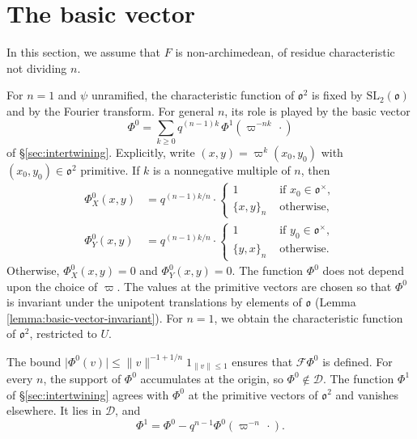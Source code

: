 \documentclass[reqno]{amsart}
\theoremstyle{plain}
\theoremstyle{definition}
\theoremstyle{itplain}
\numberwithin{equation}{section}
\numberwithin{theorem}{section}
\begin{document}
\section{The basic vector}\label{sec:basic-vector}
In this section, we assume that $F$ is non-archimedean, of residue characteristic not dividing $n$.

For $n = 1$ and $\psi$ unramified, the characteristic function of $\mathfrak{o}^2$ is fixed by $\mathrm{SL}_2(\mathfrak{o})$ and by the Fourier transform.  For general $n$, its role is played by the basic vector
\begin{equation*}
  \Phi^0 = \sum_{k \geq 0} q^{(n-1) k} \, \Phi^1(\varpi^{- n k} \, \cdot)
\end{equation*}
of \S\ref{sec:intertwining}.  Explicitly, write $(x, y) = \varpi^k (x_0, y_0)$ with $(x_0, y_0) \in \mathfrak{o}^2$ primitive.  If $k$ is a nonnegative multiple of $n$, then
\begin{equation*}
  \begin{aligned}
    \Phi^0_X(x, y) &= q^{(n-1) k / n} \cdot
    \begin{cases}
      1 & \text{ if } x_0 \in \mathfrak{o}^\times, \\
      \{x, y\}_n & \text{ otherwise,}
    \end{cases}
    \\
    \Phi^0_Y(x, y) &= q^{(n-1) k / n} \cdot
    \begin{cases}
      1 & \text{ if } y_0 \in \mathfrak{o}^\times, \\
      \{y, x\}_n & \text{ otherwise.}
    \end{cases}
  \end{aligned}
\end{equation*}
Otherwise, $\Phi^0_X(x, y) = 0$ and $\Phi^0_Y(x, y) = 0$.  The function $\Phi^0$ does not depend upon the choice of $\varpi$.  The values at the primitive vectors are chosen so that $\Phi^0$ is invariant under the unipotent translations by elements of $\mathfrak{o}$ (Lemma \ref{lemma:basic-vector-invariant}).  For $n = 1$, we obtain the characteristic function of $\mathfrak{o}^2$, restricted to $U$.

The bound $\lvert \Phi^0(v) \rvert \leq \lVert v \rVert^{-1 + 1/n} 1_{\lVert v \rVert \leq 1}$ ensures that $\mathcal{F} \Phi^0$ is defined.  For every $n$, the support of $\Phi^0$ accumulates at the origin, so $\Phi^0 \notin \mathcal{D}$.  The function $\Phi^1$ of \S\ref{sec:intertwining} agrees with $\Phi^0$ at the primitive vectors of $\mathfrak{o}^2$ and vanishes elsewhere.  It lies in $\mathcal{D}$, and
\begin{equation}\label{eq:primitive-layer}
  \Phi^1 = \Phi^0 - q^{n-1} \Phi^0(\varpi^{-n} \, \cdot).
\end{equation}
\end{document}
